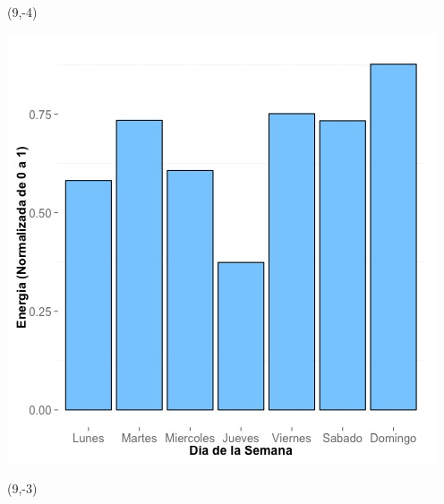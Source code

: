 \documentclass{article}\usepackage[]{graphicx}\usepackage[]{color}
\newenvironment{knitrout}{}{} %
\begin{document}
 \begin{textblock}{1}(9,-4)
\begin{minipage}{20em}
\begingroup

\endgroup
\end{minipage}
\end{textblock}


\begin{knitrout}
\color{fgcolor}
\includegraphics[scale=0.65]{figure/A2_day_of_week_plot} 
\end{knitrout}


 \begin{textblock}{1}(9,-3)
\begin{minipage}{20em}
\begingroup

\endgroup
\end{minipage}
\end{textblock}
\end{document}
